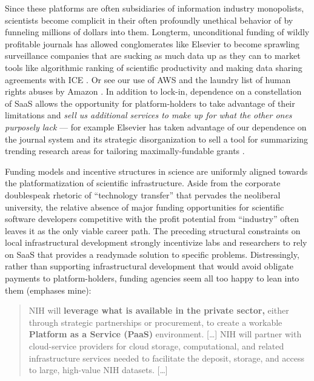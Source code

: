 \documentclass[10pt]{article}
\begin{document}
\begin{multicols}{2}
Since these platforms are often subsidiaries of information industry
monopolists, scientists become complicit in their often profoundly
unethical behavior of by funneling millions of dollars into them.
Longterm, unconditional funding of wildly profitable journals has
allowed conglomerates like Elsevier to become sprawling surveillance
companies \cite{RELXAnnualReport2020}  that are sucking as much
data up as they can to market tools like algorithmic ranking of
scientific productivity \cite{brembsAlgorithmicEmploymentDecisions2021}  and making data sharing
agreements with ICE \cite{biddleLexisNexisProvideGiant2021} . Or
see our use of AWS and the laundry list of human rights abuses by Amazon
\cite{CriticismAmazon2021} . In addition to lock-in, dependence
on a constellation of SaaS allows the opportunity for platform-holders
to take advantage of their limitations and \emph{sell us additional
services to make up for what the other ones purposely lack} --- for
example Elsevier has taken advantage of our dependence on the journal
system and its strategic disorganization to sell a tool for summarizing
trending research areas for tailoring maximally-fundable grants \cite{elsevierTopicProminenceSciencea} .

Funding models and incentive structures in science are uniformly aligned
towards the platformatization of scientific infrastructure. Aside from
the corporate doublespeak rhetoric of ``technology transfer'' that
pervades the neoliberal university, the relative absence of major
funding opportunities for scientific software developers competitive
with the profit potential from ``industry'' often leaves it as the only
viable career path. The preceding structural constraints on local
infrastructural development strongly incentivize labs and researchers to
rely on SaaS that provides a readymade solution to specific problems.
Distressingly, rather than supporting infrastructural development that
would avoid obligate payments to platform-holders, funding agencies seem
all too happy to lean into them (emphases mine):

\begin{quote}
NIH will \textbf{leverage what is available in the private sector,}
either through strategic partnerships or procurement, to create a
workable \textbf{Platform as a Service (PaaS)} environment. {[}\ldots{]}
NIH will partner with cloud-service providers for cloud storage,
computational, and related infrastructure services needed to facilitate
the deposit, storage, and access to large, high-value NIH datasets.
{[}\ldots{]}


\end{quote}
\end{multicols}
\end{document}
